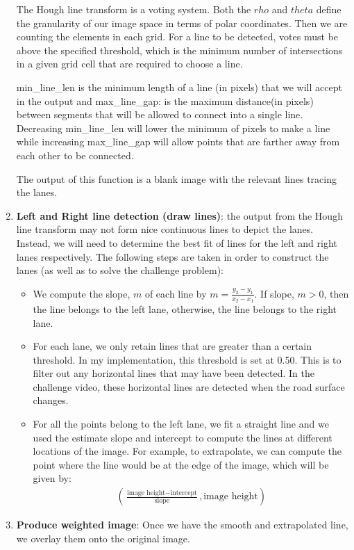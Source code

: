 \documentclass[12pt,twoside]{article}
\begin{document}
\begin{enumerate}
The Hough line transform is a voting system. Both the $rho$ and $theta$ define the granularity of our image space in terms of polar coordinates. Then we are counting the elements in each grid. For a line to be detected, votes must be above the specified threshold, which is the minimum number of intersections in a given grid cell that are required to choose a line.

min\_line\_len is the minimum length of a line (in pixels) that we will accept in the output and max\_line\_gap: is the maximum distance(in pixels) between segments that will be allowed to connect into a single line. Decreasing min\_line\_len will lower the minimum of pixels to make a line while increasing max\_line\_gap will allow points that are farther away from each other to be connected.

The output of this function is a blank image with the relevant lines tracing the lanes.

\item \textbf{Left and Right line detection (draw lines)}: the output from the Hough line transform may not form nice continuous lines to depict the lanes. Instead, we will need to determine the best fit of lines for the left and right lanes respectively. The following steps are taken in order to construct the lanes (as well as to solve the challenge problem):
\begin{itemize}
	\item We compute the slope, $m$ of each line by $m = \frac{y_2 - y_1}{x_2 - x_1}$. If slope, $m > 0$, then the line belongs to the left lane, otherwise, the line belongs to the right lane.
	\item For each lane, we only retain lines that are greater than a certain threshold. In my implementation, this threshold is set at 0.50. This is to filter out any horizontal lines that may have been detected. In the challenge video, these horizontal lines are detected when the road surface changes.
	\item For all the points belong to the left lane, we fit a straight line and we used the estimate slope and intercept to compute the lines at different locations of the image. For example, to extrapolate, we can compute the point where the line would be at the edge of the image, which will be given by:
	\begin{align*}
		\left(\frac{\text{image height} - \text{intercept}}{\text{slope}}, \text{image height} \right)
	\end{align*}
\end{itemize}

\item \textbf{Produce weighted image}: Once we have the smooth and extrapolated line, we overlay them onto the original image.

\end{enumerate}
\end{document}
